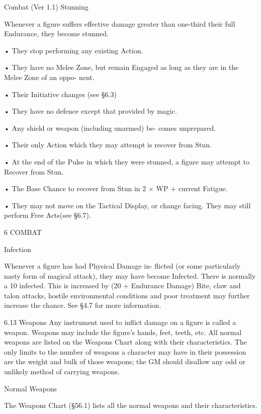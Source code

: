 \begin{Chapter}{Combat (Ver 1.1)}
Stunning 

Whenever a figure suffers effective damage greater 
than  one-third  their  full  Endurance,  they  become 
stunned.  

• They stop performing any existing Action.  

•  They  have  no  Melee  Zone,  but  remain  Engaged 
as long as they are in the Melee  Zone of an oppo-
nent.  

• Their Initiative changes (see §6.3)  

•  They  have  no  defence  except  that  provided  by 
magic.  

•  Any  shield  or  weapon  (including  unarmed)  be-
comes unprepared.  

•  Their  only  Action  which  they  may  attempt  is 
recover from Stun.  

•  At  the  end  of  the  Pulse  in  which  they  were 
stunned,  a  figure  may  attempt  to  Recover  from 
Stun.  

• The Base Chance to recover from Stun in 2 × WP 
+ current Fatigue.  

•  They  may  not  move  on  the  Tactical  Display,  or 
change  facing.  They  may  still  perform  Free 
Acts(see §6.7). 

6 COMBAT 

Infection 

Whenever  a  figure  has  had  Physical  Damage  in-
flicted (or some particularly nasty form of magical 
attack),  they  may  have  become  Infected.  There  is 
normally  a  10%
infected.  This  is  increased  by  (20  +  Endurance 
Damage)%
Bite, claw and talon attacks, hostile environmental 
conditions and poor treatment may further increase 
the chance. See §4.7 for more information. 

6.13 Weapons 
Any  instrument  used  to  inflict damage  on  a  figure 
is  called  a  weapon.  Weapons  may  include  the 
figure’s hands, feet, teeth, etc. All normal weapons 
are  listed  on  the  Weapons  Chart  along  with  their 
characteristics.  The  only  limits  to  the  number  of 
weapons  a  character  may  have  in  their  possession 
are the weight and bulk of those weapons; the GM 
should  disallow  any  odd  or  unlikely  method  of 
carrying weapons. 

Normal Weapons 

The  Weapons  Chart  (§56.1)  lists  all  the  normal 
weapons and their characteristics. 


\end{Chapter}
